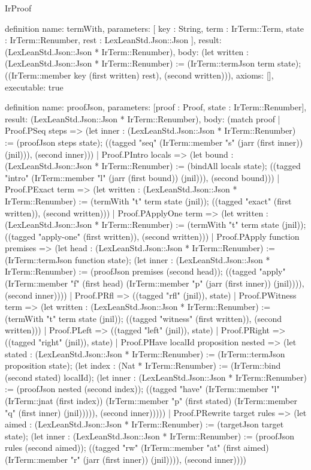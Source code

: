 \begin{lexlean}{IrProof}
\begin{semanticmodule}
definition{
  name: termWith,
  parameters: [
    key : String,
    term : IrTerm::Term,
    state : IrTerm::Renumber,
    rest : LexLeanStd.Json::Json
  ],
  result: (LexLeanStd.Json::Json * IrTerm::Renumber),
  body: (let written : (LexLeanStd.Json::Json * IrTerm::Renumber) := (IrTerm::termJson term state); ((IrTerm::member key (first written) rest), (second written))),
  axioms: [],
  executable: true
}

definition{
  name: proofJson,
  parameters: [proof : Proof, state : IrTerm::Renumber],
  result: (LexLeanStd.Json::Json * IrTerm::Renumber),
  body: (match proof
    | Proof.PSeq steps => (let inner : (LexLeanStd.Json::Json * IrTerm::Renumber) := (proofJson steps state); ((tagged "seq" (IrTerm::member "s" (jarr (first inner)) (jnil))), (second inner)))
    | Proof.PIntro locals => (let bound : (LexLeanStd.Json::Json * IrTerm::Renumber) := (bindAll locals state); ((tagged "intro" (IrTerm::member "l" (jarr (first bound)) (jnil))), (second bound)))
    | Proof.PExact term => (let written : (LexLeanStd.Json::Json * IrTerm::Renumber) := (termWith "t" term state (jnil)); ((tagged "exact" (first written)), (second written)))
    | Proof.PApplyOne term => (let written : (LexLeanStd.Json::Json * IrTerm::Renumber) := (termWith "t" term state (jnil)); ((tagged "apply-one" (first written)), (second written)))
    | Proof.PApply function premises => (let head : (LexLeanStd.Json::Json * IrTerm::Renumber) := (IrTerm::termJson function state); (let inner : (LexLeanStd.Json::Json * IrTerm::Renumber) := (proofJson premises (second head)); ((tagged "apply" (IrTerm::member "f" (first head) (IrTerm::member "p" (jarr (first inner)) (jnil)))), (second inner))))
    | Proof.PRfl => ((tagged "rfl" (jnil)), state)
    | Proof.PWitness term => (let written : (LexLeanStd.Json::Json * IrTerm::Renumber) := (termWith "t" term state (jnil)); ((tagged "witness" (first written)), (second written)))
    | Proof.PLeft => ((tagged "left" (jnil)), state)
    | Proof.PRight => ((tagged "right" (jnil)), state)
    | Proof.PHave localId proposition nested => (let stated : (LexLeanStd.Json::Json * IrTerm::Renumber) := (IrTerm::termJson proposition state); (let index : (Nat * IrTerm::Renumber) := (IrTerm::bind (second stated) localId); (let inner : (LexLeanStd.Json::Json * IrTerm::Renumber) := (proofJson nested (second index)); ((tagged "have" (IrTerm::member "l" (IrTerm::jnat (first index)) (IrTerm::member "p" (first stated) (IrTerm::member "q" (first inner) (jnil))))), (second inner)))))
    | Proof.PRewrite target rules => (let aimed : (LexLeanStd.Json::Json * IrTerm::Renumber) := (targetJson target state); (let inner : (LexLeanStd.Json::Json * IrTerm::Renumber) := (proofJson rules (second aimed)); ((tagged "rw" (IrTerm::member "at" (first aimed) (IrTerm::member "r" (jarr (first inner)) (jnil)))), (second inner))))
}
\end{semanticmodule}
\end{lexlean}
